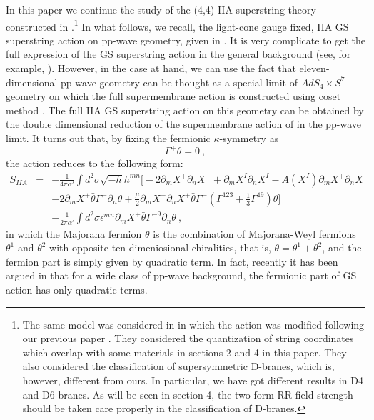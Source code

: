 \documentclass[a4paper,12pt]{article}
\begin{document}
In this paper we continue the study of the (4,4) IIA superstring
theory constructed in \cite{hyu074}.\footnote{The same model was
considered in \cite{sug029} in which the action was modified following
our previous paper \cite{hyu074}. They considered the quantization of
string coordinates which overlap with some materials in sections 2 and
4 in this paper. They also considered the classification of
supersymmetric D-branes, which is, however, different from ours.  In
particular, we have got different results in D4 and D6 branes. As will
be seen in section 4, the two form RR field strength should be taken
care properly in the classification of D-branes.}  In what follows, we
recall, the light-cone gauge fixed, IIA GS superstring action on
pp-wave geometry, given in \cite{hyu074}.  It is very complicate to
get the full expression of the GS superstring action in the general
background (see, for example, \cite{cve202,hyu247}).  However, in the
case at hand, we can use the fact that eleven-dimensional pp-wave
geometry can be thought as a special limit of $AdS_4 \times S^7$
geometry on which the full supermembrane action is constructed using
coset method \cite{dew209}.  The full IIA GS superstring action on
this geometry can be obtained by the double dimensional reduction
\cite{duf70} of the supermembrane action of \cite{dew209} in the
pp-wave limit.  It turns out that, by fixing the fermionic
$\kappa$-symmetry as
\begin{equation}
\Gamma^+ \theta = 0~,
\label{kfix}
\end{equation}
the action reduces to the following form:
\begin{eqnarray}
S_{IIA} 
  &=& -\frac{1}{4 \pi \alpha'} \int d^2 \sigma \sqrt{-h} h^{mn}
  \bigg[ -2 \partial_m X^+ \partial_n X^- 
    + \partial_m X^I \partial_n X^I 
    - A(X^I) \partial_m X^+ \partial_n X^-
                         \nonumber \\
  & & -2 \partial_m X^+ \bar{\theta} \Gamma^- \partial_n \theta
      + \frac{\mu}{2} \partial_m X^+ \partial_n X^+
       \bar{\theta} \Gamma^- 
         \left( \Gamma^{123} + \frac{1}{3} \Gamma^{49}
         \right) \theta
  \bigg]    
                         \nonumber \\
  & &  - \frac{1}{2 \pi \alpha'} \int d^2 \sigma
   \epsilon^{mn} \partial_m X^+ \bar{\theta} \Gamma^{-9} 
    \partial_n \theta ~,
\end{eqnarray}
in which the Majorana fermion $\theta$ is the combination of
Majorana-Weyl fermions $\theta^1$ and $\theta^2$ with opposite ten
dimeniosional chiralities, that is, $\theta = \theta^1 + \theta^2$,
and the fermion part is simply given by quadratic term.  In fact,
recently it has been argued in \cite{miz043,rus114} that for a wide
class of pp-wave background, the fermionic part of GS action has only
quadratic terms.
\end{document}
